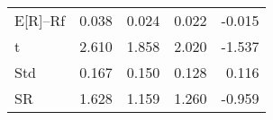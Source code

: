 \begin{tabular}{lrrrr}
\toprule
\midrule
E[R]--Rf & 0.038 & 0.024 & 0.022 & -0.015 \\
t & 2.610 & 1.858 & 2.020 & -1.537 \\
Std & 0.167 & 0.150 & 0.128 & 0.116 \\
SR & 1.628 & 1.159 & 1.260 & -0.959 \\
\bottomrule
\end{tabular}
